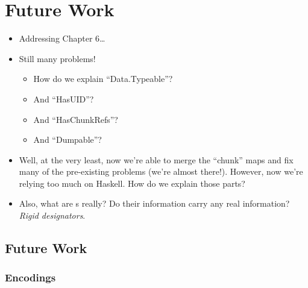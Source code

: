 \chapter{Future Work}
\label{chap:futureWork}


\begin{itemize}

      \item Addressing Chapter 6\ldots{}

      \item Still many problems!
            \begin{itemize}

                  \item How do we explain ``Data.Typeable''?

                  \item And ``HasUID''?

                  \item And ``HasChunkRefs''?

                  \item And ``Dumpable''?

            \end{itemize}

      \item Well, at the very least, now we're able to merge the ``chunk'' maps
            and fix many of the pre-existing problems (we're almost there!).
            However, now we're relying too much on Haskell. How do we explain
            those parts?

      \item Also, what are \UID{}s really? Do their information carry any real
            information? \textit{Rigid designators}.

\end{itemize}

\section{Future Work}

\subsection{Encodings}

